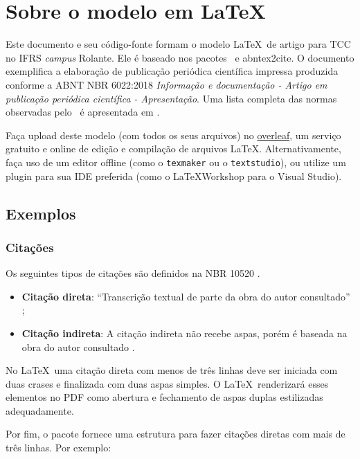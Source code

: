 \section{Sobre o modelo em \LaTeX}

Este documento e seu código-fonte formam o modelo \LaTeX\ de artigo para TCC no IFRS \textit{campus} Rolante. Ele é baseado nos pacotes \abnTeX\ e \textsf{abntex2cite}. O documento exemplifica a elaboração de publicação periódica científica impressa produzida conforme a ABNT NBR 6022:2018 \emph{Informação e documentação - Artigo em publicação periódica científica - Apresentação}. Uma lista completa das normas observadas pelo \abnTeX\  é apresentada em .

Faça upload deste modelo (com todos os seus arquivos) no \href{https://overleaf.com/project}{overleaf}, um  serviço gratuito e online de edição e compilação de arquivos \LaTeX. Alternativamente, faça uso de um editor offline (como o \texttt{texmaker} ou o \texttt{textstudio}), ou utilize um plugin para sua IDE preferida (como o \LaTeX Workshop para o Visual Studio).

\subsection{Exemplos}

\subsubsection{Citações}

Os seguintes tipos de citações são definidos na NBR 10520 \cite{NBR10520:2002}.

\begin{itemize}
	\item \textbf{Citação direta}: ``Transcrição textual de parte da obra do autor consultado'' \cite{NBR10520:2002};
	\item \textbf{Citação indireta}: A citação indireta não recebe aspas, porém é baseada na obra do autor consultado \cite{NBR10520:2002}.
\end{itemize}

No \LaTeX\ uma citação direta com menos de três linhas deve ser iniciada com duas crases e finalizada com duas aspas simples. O \LaTeX\ renderizará esses elementos no PDF como abertura e fechamento de aspas duplas estilizadas adequadamente.

Por fim, o pacote \abnTeX fornece uma estrutura para fazer citações diretas com mais de três linhas. Por exemplo:

